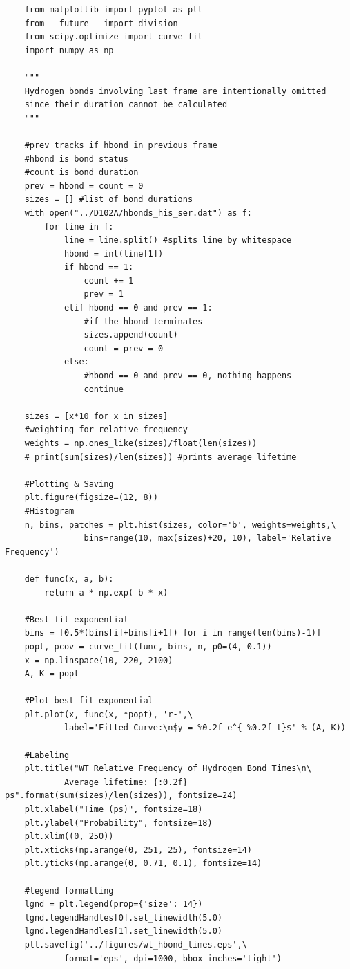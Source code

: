 \documentclass[12pt, twocolumn]{article}
\begin{document}
\appendix

\onecolumn
\begin{verbatim}
    from matplotlib import pyplot as plt
    from __future__ import division
    from scipy.optimize import curve_fit
    import numpy as np

    """
    Hydrogen bonds involving last frame are intentionally omitted
    since their duration cannot be calculated
    """

    #prev tracks if hbond in previous frame
    #hbond is bond status
    #count is bond duration
    prev = hbond = count = 0
    sizes = [] #list of bond durations
    with open("../D102A/hbonds_his_ser.dat") as f:
        for line in f:
            line = line.split() #splits line by whitespace
            hbond = int(line[1])
            if hbond == 1:
                count += 1
                prev = 1
            elif hbond == 0 and prev == 1:
                #if the hbond terminates
                sizes.append(count)
                count = prev = 0
            else:
                #hbond == 0 and prev == 0, nothing happens
                continue

    sizes = [x*10 for x in sizes]
    #weighting for relative frequency
    weights = np.ones_like(sizes)/float(len(sizes))
    # print(sum(sizes)/len(sizes)) #prints average lifetime

    #Plotting & Saving
    plt.figure(figsize=(12, 8))
    #Histogram
    n, bins, patches = plt.hist(sizes, color='b', weights=weights,\
                bins=range(10, max(sizes)+20, 10), label='Relative Frequency')

    def func(x, a, b):
        return a * np.exp(-b * x)

    #Best-fit exponential
    bins = [0.5*(bins[i]+bins[i+1]) for i in range(len(bins)-1)]
    popt, pcov = curve_fit(func, bins, n, p0=(4, 0.1))
    x = np.linspace(10, 220, 2100)
    A, K = popt

    #Plot best-fit exponential
    plt.plot(x, func(x, *popt), 'r-',\
            label='Fitted Curve:\n$y = %0.2f e^{-%0.2f t}$' % (A, K))

    #Labeling
    plt.title("WT Relative Frequency of Hydrogen Bond Times\n\
            Average lifetime: {:0.2f} ps".format(sum(sizes)/len(sizes)), fontsize=24)
    plt.xlabel("Time (ps)", fontsize=18)
    plt.ylabel("Probability", fontsize=18)
    plt.xlim((0, 250))
    plt.xticks(np.arange(0, 251, 25), fontsize=14)
    plt.yticks(np.arange(0, 0.71, 0.1), fontsize=14)

    #legend formatting
    lgnd = plt.legend(prop={'size': 14})
    lgnd.legendHandles[0].set_linewidth(5.0)
    lgnd.legendHandles[1].set_linewidth(5.0)
    plt.savefig('../figures/wt_hbond_times.eps',\
            format='eps', dpi=1000, bbox_inches='tight')
\end{verbatim}
\end{document}
